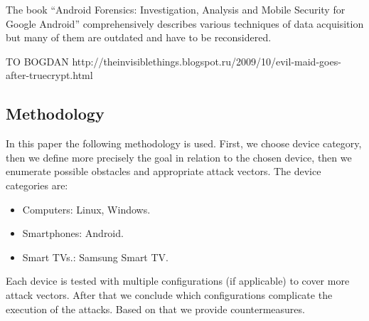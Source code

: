 The book “Android Forensics: Investigation, Analysis and Mobile Security for Google Android” comprehensively describes various techniques of data acquisition but many of them are outdated and have to be reconsidered.

TO BOGDAN http://theinvisiblethings.blogspot.ru/2009/10/evil-maid-goes-after-truecrypt.html


\subsection{Methodology}

In this paper the following methodology is used. First, we choose device category,  then we define more precisely the goal in relation to the chosen device, then we enumerate possible obstacles and appropriate attack vectors. The device categories are:

\begin{itemize}
\item{}
Computers: Linux, Windows.
\item{}
Smartphones: Android.
\item{}
Smart TVs.: Samsung Smart TV.
\end{itemize}

Each device is tested with multiple configurations (if applicable) to cover more attack vectors. After that we conclude which configurations complicate the execution of the attacks. Based on that we provide countermeasures.

